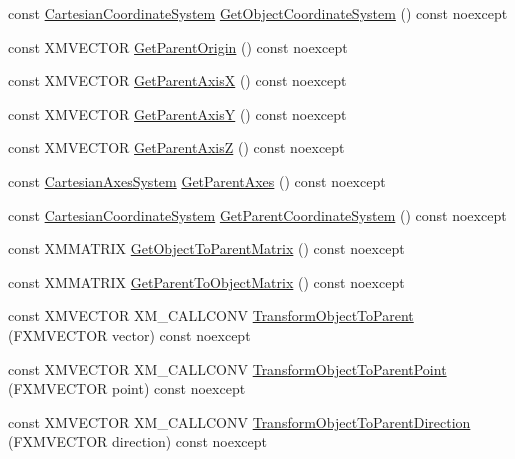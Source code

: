 \begin{DoxyCompactItemize}
const \hyperlink{structmage_1_1_cartesian_coordinate_system}{Cartesian\+Coordinate\+System} \hyperlink{structmage_1_1_transform_a051432f12292cd6c46ec2483eca87d86}{Get\+Object\+Coordinate\+System} () const noexcept
\item 
const X\+M\+V\+E\+C\+T\+OR \hyperlink{structmage_1_1_transform_ac15f904c1b365583513a8827c483ff21}{Get\+Parent\+Origin} () const noexcept
\item 
const X\+M\+V\+E\+C\+T\+OR \hyperlink{structmage_1_1_transform_a552e7b9e654d57e6ba6281eaa6d25ca2}{Get\+Parent\+AxisX} () const noexcept
\item 
const X\+M\+V\+E\+C\+T\+OR \hyperlink{structmage_1_1_transform_a594483a22316fa35cac46e6e4d10ec3b}{Get\+Parent\+AxisY} () const noexcept
\item 
const X\+M\+V\+E\+C\+T\+OR \hyperlink{structmage_1_1_transform_a1661099c0f983c32c1145f970d039d0b}{Get\+Parent\+AxisZ} () const noexcept
\item 
const \hyperlink{structmage_1_1_cartesian_axes_system}{Cartesian\+Axes\+System} \hyperlink{structmage_1_1_transform_aad9c46d73c7afd7412a65fe5381ae4b6}{Get\+Parent\+Axes} () const noexcept
\item 
const \hyperlink{structmage_1_1_cartesian_coordinate_system}{Cartesian\+Coordinate\+System} \hyperlink{structmage_1_1_transform_a45b460585620b4b3e9ae20437ba1ef71}{Get\+Parent\+Coordinate\+System} () const noexcept
\item 
const X\+M\+M\+A\+T\+R\+IX \hyperlink{structmage_1_1_transform_a1171e7ebcdaea6329871a3c8946dbfe6}{Get\+Object\+To\+Parent\+Matrix} () const noexcept
\item 
const X\+M\+M\+A\+T\+R\+IX \hyperlink{structmage_1_1_transform_afbe8535cd6616d92d1107c6baff78125}{Get\+Parent\+To\+Object\+Matrix} () const noexcept
\item 
const X\+M\+V\+E\+C\+T\+OR X\+M\+\_\+\+C\+A\+L\+L\+C\+O\+NV \hyperlink{structmage_1_1_transform_a622f8234d70768c33a3cbb8fa50932cc}{Transform\+Object\+To\+Parent} (F\+X\+M\+V\+E\+C\+T\+OR vector) const noexcept
\item 
const X\+M\+V\+E\+C\+T\+OR X\+M\+\_\+\+C\+A\+L\+L\+C\+O\+NV \hyperlink{structmage_1_1_transform_a2d93dac4ae0b5b2723d2fbce077da85f}{Transform\+Object\+To\+Parent\+Point} (F\+X\+M\+V\+E\+C\+T\+OR point) const noexcept
\item 
const X\+M\+V\+E\+C\+T\+OR X\+M\+\_\+\+C\+A\+L\+L\+C\+O\+NV \hyperlink{structmage_1_1_transform_afddbd41527257bf0ed20ceafa19b49c9}{Transform\+Object\+To\+Parent\+Direction} (F\+X\+M\+V\+E\+C\+T\+OR direction) const noexcept

\end{DoxyCompactItemize}
